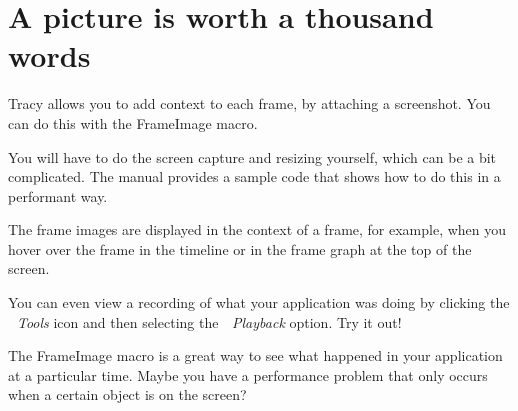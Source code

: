 \chapter{A picture is worth a thousand words }
\hypertarget{md__mono_engine_2thirdparty_2tracy_2profiler_2src_2achievements_2_frame_images}{}\label{md__mono_engine_2thirdparty_2tracy_2profiler_2src_2achievements_2_frame_images}
\label{md__mono_engine_2thirdparty_2tracy_2profiler_2src_2achievements_2_frame_images_autotoc_md1106}%
%


Tracy allows you to add context to each frame, by attaching a screenshot. You can do this with the {\ttfamily Frame\+Image} macro.

You will have to do the screen capture and resizing yourself, which can be a bit complicated. The manual provides a sample code that shows how to do this in a performant way.

The frame images are displayed in the context of a frame, for example, when you hover over the frame in the timeline or in the frame graph at the top of the screen.

You can even view a recording of what your application was doing by clicking the {\itshape  Tools} icon and then selecting the {\itshape  Playback} option. Try it out!

The {\ttfamily Frame\+Image} macro is a great way to see what happened in your application at a particular time. Maybe you have a performance problem that only occurs when a certain object is on the screen? 